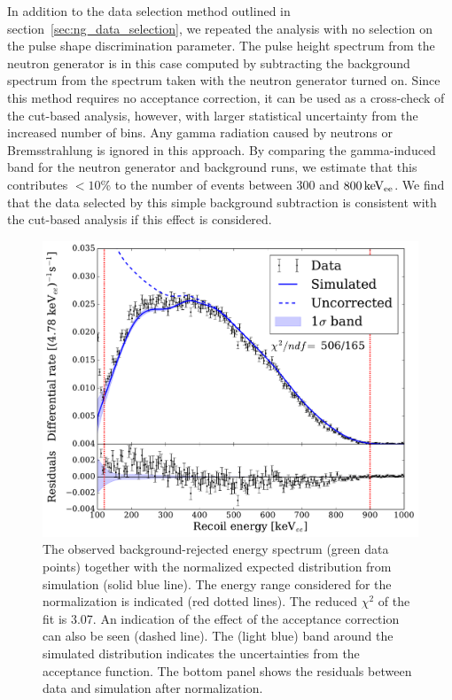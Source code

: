 In addition to the data selection method outlined in section~\ref{sec:ng_data_selection}, we repeated the analysis with no selection on the pulse shape discrimination parameter. The pulse height spectrum from the neutron generator is in this case computed by subtracting the background spectrum from the spectrum taken with the neutron generator turned on. Since this method requires no acceptance correction, it can be used as a cross-check of the cut-based analysis, however, with larger statistical uncertainty from the increased number of bins. Any gamma radiation caused by neutrons or Bremsstrahlung is ignored in this approach. By comparing the gamma-induced band for the neutron generator and background runs, we estimate that this contributes $<10$\% to the number of events between $300$ and $800\,\mathrm{keV_{ee}}$. We find that the data selected by this simple background subtraction is consistent with the cut-based analysis if this effect is considered. %

\begin{figure}[!htbp]
\centering
    \includegraphics[width=\linewidth]{figures/ng/fit_with_acc_r}
    \caption{The observed background-rejected energy spectrum (green data points) together with the normalized expected distribution from simulation (solid blue line). The energy range considered for the normalization is indicated (red dotted lines). The reduced $\chi^2$ of the fit is 3.07. An indication of the effect of the acceptance correction can also be seen (dashed line). The (light blue) band around the simulated distribution indicates the uncertainties from the acceptance function. The bottom panel shows the residuals between data and simulation after normalization. }\label{fig:fit_with_acc}
\end{figure}

